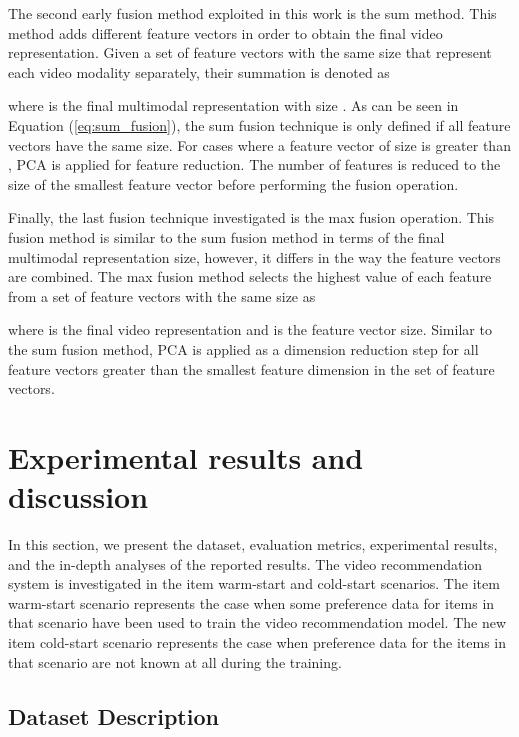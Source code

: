 \documentclass[review]{elsarticle}
\begin{document}
The second early fusion method exploited in this work is the sum method. This method adds different feature vectors in order to obtain the final video representation. Given a set of  feature vectors with the same size that represent each video modality separately, their summation is denoted as



\noindent where  is the final multimodal representation with size . As can be seen in Equation (\ref{eq:sum_fusion}), the sum fusion technique is only defined if all feature vectors have the same size. For cases where a feature vector  of size  is greater than , \ac{PCA} is applied for feature reduction. The number of features is reduced to the size of the smallest feature vector before performing the fusion operation. 

Finally, the last fusion technique investigated is the max fusion operation. This fusion method is similar to the sum fusion method in terms of the final multimodal representation size, however, it differs in the way the feature vectors are combined. The max fusion method selects the highest value of each feature from a set of  feature vectors with the same size as 

where  is the final video representation and  is the feature vector size. Similar to the sum fusion method, \ac{PCA} is applied as a dimension reduction step for all feature vectors greater than the smallest feature dimension in the set of  feature vectors. 






\section{Experimental results and discussion}\label{sec:experiments}
In this section, we present the dataset, evaluation metrics, experimental results, and the in-depth analyses of the reported results. The video recommendation system is investigated in the item warm-start and cold-start scenarios. The item warm-start scenario represents the case when some preference data for items in that scenario have been used to train the video recommendation model. The new item cold-start scenario represents the case when preference data for the items in that scenario are not known at all during the training.  





\subsection{Dataset Description}\label{sec:dataset}
\end{document}
